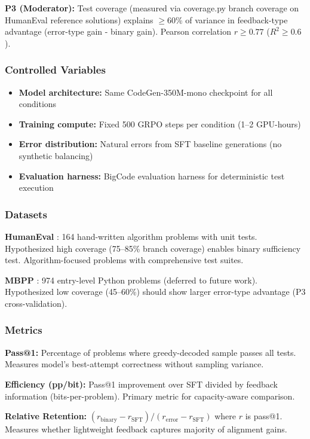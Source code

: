 \textbf{P3 (Moderator):} Test coverage (measured via coverage.py branch coverage on HumanEval reference solutions) explains $\geq$60\% of variance in feedback-type advantage (error-type gain - binary gain). Pearson correlation $r \geq 0.77$ ($R^2 \geq 0.6$).

\subsubsection{Controlled Variables}

\begin{itemize}
\item \textbf{Model architecture:} Same CodeGen-350M-mono checkpoint for all conditions
\item \textbf{Training compute:} Fixed 500 GRPO steps per condition (1--2 GPU-hours)
\item \textbf{Error distribution:} Natural errors from SFT baseline generations (no synthetic balancing)
\item \textbf{Evaluation harness:} BigCode evaluation harness for deterministic test execution
\end{itemize}

\subsubsection{Datasets}

\textbf{HumanEval} \cite{austin2021program}: 164 hand-written algorithm problems with unit tests. Hypothesized high coverage (75--85\% branch coverage) enables binary sufficiency test. Algorithm-focused problems with comprehensive test suites.

\textbf{MBPP} \cite{chen2021evaluating}: 974 entry-level Python problems (deferred to future work). Hypothesized low coverage (45--60\%) should show larger error-type advantage (P3 cross-validation).

\subsubsection{Metrics}

\textbf{Pass@1:} Percentage of problems where greedy-decoded sample passes all tests. Measures model's best-attempt correctness without sampling variance.

\textbf{Efficiency (pp/bit):} Pass@1 improvement over SFT divided by feedback information (bits-per-problem). Primary metric for capacity-aware comparison.

\textbf{Relative Retention:} $(r_{\text{binary}} - r_{\text{SFT}}) / (r_{\text{error}} - r_{\text{SFT}})$ where $r$ is pass@1. Measures whether lightweight feedback captures majority of alignment gains.

